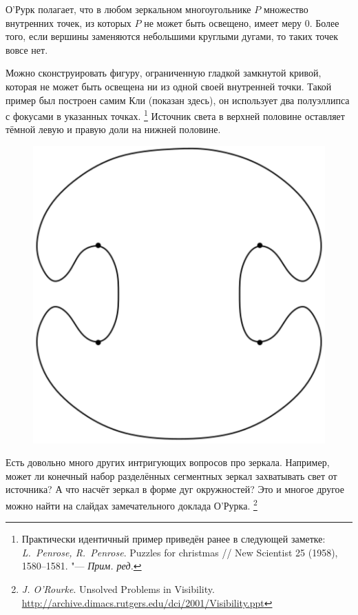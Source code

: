 \documentclass[twoside]{book}
\begin{document}
О’Рурк полагает, что в любом зеркальном многоугольнике $P$ множество внутренних точек, из которых $P$ не может быть освещено, имеет меру 0.
Более того, если вершины заменяются небольшими круглыми дугами, то таких точек вовсе нет.


Можно сконструировать фигуру, ограниченную гладкой замкнутой кривой, которая не может быть освещена ни из одной своей внутренней точки. 
Такой пример был построен самим Кли (показан здесь), он использует два полуэллипса с фокусами в указанных точках.%
\footnote{Практически идентичный пример приведён ранее в следующей заметке: \emph{L.~Penrose, R.~Penrose}. Puzzles for christmas /\!/ {New Scientist} 25 (1958), 1580--1581. "--- \emph{Прим. ред.}}
Источник света в верхней половине оставляет тёмной левую и правую доли на нижней половине.


\begin{figure}[!ht]
\centering
\includegraphics[scale=0.5]{Figs/UnsolvedPuzzles/klee}
\end{figure} 

Есть довольно много других интригующих вопросов про зеркала.
Например, может ли конечный набор разделённых сегментных зеркал захватывать свет от источника?
А что насчёт зеркал в форме дуг окружностей?
Это и многое другое можно найти на слайдах замечательного доклада О’Рурка.%
\footnote{\emph{J. O'Rourke}. Unsolved Problems in Visibility. \url{http://archive.dimacs.rutgers.edu/dci/2001/Visibility.ppt}}
\end{document}
